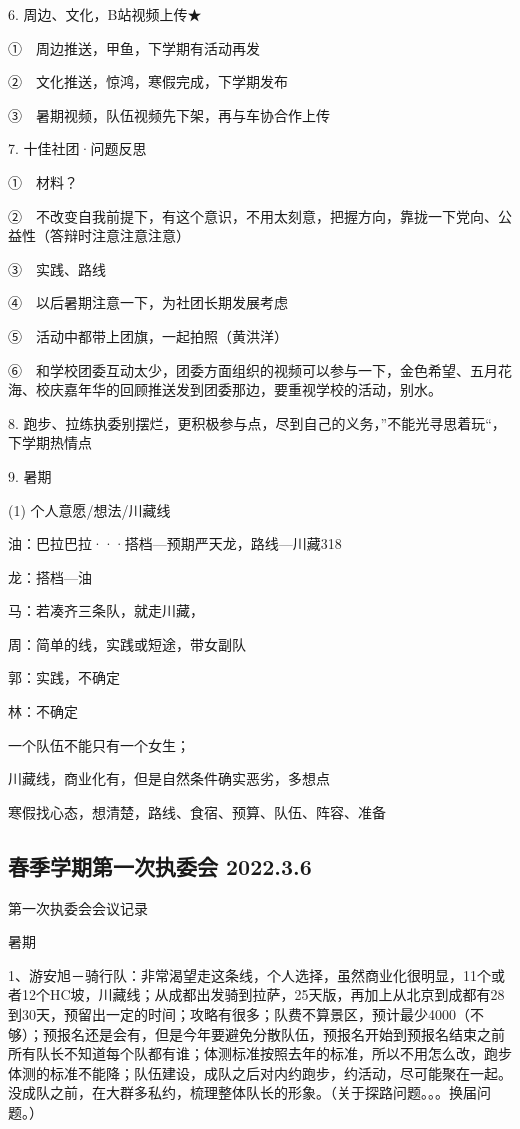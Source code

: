 \documentclass{ctexbook}
\begin{document}
6.	周边、文化，B站视频上传★

①　周边推送，甲鱼，下学期有活动再发

②　文化推送，惊鸿，寒假完成，下学期发布

③　暑期视频，队伍视频先下架，再与车协合作上传

7.	十佳社团·问题反思

①　材料？

②　不改变自我前提下，有这个意识，不用太刻意，把握方向，靠拢一下党向、公益性（答辩时注意注意注意）

③　实践、路线

④　以后暑期注意一下，为社团长期发展考虑

⑤　活动中都带上团旗，一起拍照（黄洪洋）

⑥　和学校团委互动太少，团委方面组织的视频可以参与一下，金色希望、五月花海、校庆嘉年华的回顾推送发到团委那边，要重视学校的活动，别水。

8.	跑步、拉练执委别摆烂，更积极参与点，尽到自己的义务，''不能光寻思着玩``，下学期热情点

9.	暑期

(1)	个人意愿/想法/川藏线

油：巴拉巴拉···搭档—预期严天龙，路线—川藏318

龙：搭档—油

马：若凑齐三条队，就走川藏，

周：简单的线，实践或短途，带女副队

郭：实践，不确定

林：不确定

一个队伍不能只有一个女生；

川藏线，商业化有，但是自然条件确实恶劣，多想点

寒假找心态，想清楚，路线、食宿、预算、队伍、阵容、准备

\subsection{春季学期第一次执委会 2022.3.6}

第一次执委会会议记录

暑期

1、游安旭－骑行队：非常渴望走这条线，个人选择，虽然商业化很明显，11个或者12个HC坡，川藏线；从成都出发骑到拉萨，25天版，再加上从北京到成都有28到30天，预留出一定的时间；攻略有很多；队费不算景区，预计最少4000（不够）；预报名还是会有，但是今年要避免分散队伍，预报名开始到预报名结束之前所有队长不知道每个队都有谁；体测标准按照去年的标准，所以不用怎么改，跑步体测的标准不能降；队伍建设，成队之后对内约跑步，约活动，尽可能聚在一起。没成队之前，在大群多私约，梳理整体队长的形象。（关于探路问题。。。换届问题。）
\end{document}

